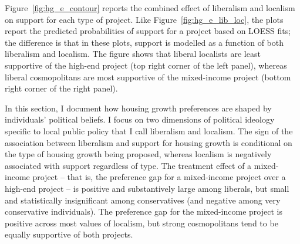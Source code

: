 \documentclass[article,12pt]{memoir}
\begin{document}
Figure~\ref{fig:hg_e_contour} reports the combined effect of liberalism and localism on support for each type of project.  Like Figure~\ref{fig:hg_e_lib_loc}, the plots report the predicted probabilities of support for a project based on LOESS fits; the difference is that in these plots, support is modelled as a function of both liberalism and localism.  The figure shows that liberal localists are least supportive of the high-end project (top right corner of the left panel), whereas liberal cosmopolitans are most supportive of the mixed-income project (bottom right corner of the right panel). 


In this section, I document how housing growth preferences are shaped by individuals' political beliefs.  I focus on two dimensions of political ideology specific to local public policy that I call liberalism and localism.  The sign of the association between liberalism and support for housing growth is conditional on the type of housing growth being proposed, whereas localism is negatively associated with support regardless of type. The treatment effect of a mixed-income project -- that is, the preference gap for a mixed-income project over a high-end project -- is positive and substantively large among liberals, but small and statistically insignificant among conservatives (and negative among very conservative individuals).  The preference gap for the mixed-income project is positive across most values of localism, but strong cosmopolitans tend to be equally supportive of both projects.
\end{document}
